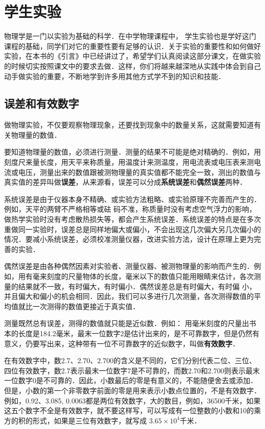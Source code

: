 \chapter{学生实验}

物理学是一门以实验为基础的科学．在中学物理课程中，
学生实验也是学好这门课程的基础，同学们对它的重要性要有足够的认识．关于实验的重要性和如何做好实验，在本书的《引言》中已经讲过了，希望学们认真阅读这部分课文，在做实验的时候切实按照课文中的要求去做．这样，你们将越来越深地从实践中体会到自己动手做实验的重要，不断地学到许多用其他方式学不到的知识和技能．
	
\section*{误差和有效数字}

做物理实验，不仅要观察物理现象，还要找到现象中的数量关系，这就需要知道有关物理量的数值．

要知道物理量的数值，必须进行测量．测量的结果不可能是绝对精确的．例如，用刻度尺来量长度，用天平来称质量，用温度计来测温度，用电流表或电压表来测电流或电压，测量出来的数值跟被测物理量的真实值都不能完全一致，测出的数值与真实值的差异叫做\textbf{误差}，从来源看，误差可以分成\textbf{系统误差}和\textbf{偶然误差}两种．

系统误差是由于仪器本身不精确、或实验方法粗略、或实验原理不完善而产生的．例如，天平的两臂不严格相等或砝
码不准，称质量时没有考虑空气浮力的影响，做热学实验时没有考虑散热损失等，都会产生系统误差．系统误差的特点是在多次重做同一实验时，误差总是同样地偏大或偏小，不会出现这几次偏大另几次偏小的情况．要减小系统误差，必须校准测量仪器，改进实验方法，设计在原理上更为完善的实验．

偶然误差是由各种偶然因素对实验者、测量仪器、被测物理量的影响而产生的．例如，用有毫来刻度的尺量物体的长度，毫米以下的数值只能用眼睛来估计，各次测量的结果就不一致，有时偏大，有时偏小．偶然误差总是有时偏大，有时偏
小，并且偏大和偏小的机会相同．因此，我们可以多进行几次测量，各次测得数值的平均值就比一次测得的数值更接近于真实值．

测量既然总有误差，测得的数值就只能是近似数．例如：
用毫米刻度的尺量出书本的长度是184.2毫米，最末一位数字2是估计出来的，是不可靠数字，但是仍然有意义，仍要写出来，这种带有一位不可靠数字的近似数字，叫做\textbf{有效数字}．

在有效数字中，数2.7、2.70、2.700的含义是不同的，它们分别代表二位、三位、四位有效数字，数2.7表示最末一位数字7是不可靠的，而数2.70和2.700则表示最末一位数字0是不可靠的．因此，小数最后的零是有意义的，不能随便舍去或添加．但是，小数的第一个非零数字前面的零是用来表示小数点位置的，不是有效数字．例如，0.92、3.085, 0.0063都是两位有效数字，大的数目，例如，36500千米，如果这五个数字不全是有效数字，就不要这样写，可以写成有一位整数的小数和10的乘方的积的形式，如果是三位有效数字，就写成
$3.65\times 10^4$千米．


